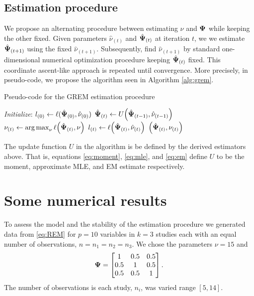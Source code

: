 \documentclass{article}\usepackage[]{graphicx}\usepackage[]{color}
\begin{document}
\subsection{Estimation procedure}
We propose an alternating procedure between estimating $\nu$ and ${\boldsymbol{\Psi}}$ while keeping the other fixed.
Given parameters $\hat{\nu}_{(t)}$ and ${\hat{\boldsymbol{\Psi}}}_{(t)}$ at iteration $t$, we we estimate ${\hat{\boldsymbol{\Psi}}}_{(t+1)}$ using the fixed $\hat{\nu}_{(t+1)}$. Subsequently, find $\hat{\nu}_{(t+1)}$ by standard one-dimensional numerical optimization procedure keeping ${\hat{\boldsymbol{\Psi}}}_{(t)}$ fixed.
This coordinate ascent-like approach is repeated until convergence.
More precisely, in pseudo-code, we propose the algorithm seen in Algorithm \ref{alg:grem}.
\begin{algorithm}
\caption{Pseudo-code for the GREM estimation procedure}\label{alg:grem}
\begin{algorithmic}[1]
\State {}
\State {}
\State
\State \emph{Initialize}: $l_{(0)} \gets \ell({\hat{\boldsymbol{\Psi}}}_{(0)}, \hat{\nu}_{(0)})$
  \State ${\hat{\boldsymbol{\Psi}}}_{(t)} \gets U\!\left({\hat{\boldsymbol{\Psi}}}_{(t-1)}, \hat{\nu}_{(t-1)}\right)$
  \State $\nu_{(t)} \gets \operatorname*{arg\,max}_\nu \ell\!\left({\hat{\boldsymbol{\Psi}}}_{(t)}, \nu\right)$
  \State $l_{(t)} \gets \ell\!\left({\hat{\boldsymbol{\Psi}}}_{(t)}, \hat{\nu}_{(t)}\right)$
      \State \Return $\left({\hat{\boldsymbol{\Psi}}}_{(t)}, \nu_{(t)}\right)$
    \EndIf
 \EndFor
\EndProcedure
\end{algorithmic}
\end{algorithm}
The update function $U$ in the algorithm is be defined by the derived estimators above. That is, equations \eqref{eq:moment}, \eqref{eq:mle}, and \eqref{eq:em} define $U$ to be the moment, approximate MLE, and EM estimate respectively.

\section{Some numerical results}


To assess the model and the stability of the estimation procedure we generated data from \eqref{eq:REM} for $p = 10$ variables in $k = 3$ studies each with an equal number of observations, $n = n_1 = n_2 = n_3$. We chose the parameters $\nu = 15$ and
\begin{align*}
{\boldsymbol{\Psi}} =
  \begin{bmatrix}
     1 & 0.5 & 0.5 \\
     0.5 & 1 & 0.5 \\
     0.5 & 0.5 & 1 \\
  \end{bmatrix}.
\end{align*}
The number of observations is each study, $n_i$, was varied range $[5,14]$.
\end{document}
